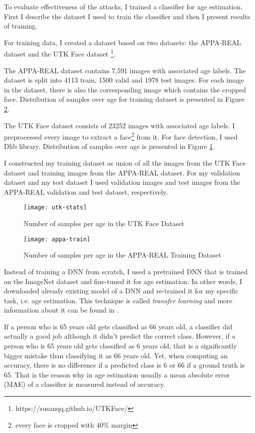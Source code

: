 To evaluate effectiveness of the attacks, I trained a classifier for age estimation. 
First I describe the dataset I used to train the classifier and then I present results of training. 

For training data, I created a dataset based on two datasets: the APPA-REAL dataset \cite{agustsson2017appareal}  and the UTK Face dataset \footnote{https://susanqq.github.io/UTKFace/}.

The APPA-REAL dataset contains 7,591 images with associated age labels. The dataset is split into 4113 train, 1500 valid and 1978 test images. For each image in the dataset, there is also the corresponding image which contains the cropped face. Distribution of samples over age for training dataset is presented in Figure \ref{fig:appa-train-stats}.

The UTK Face dataset consists of 23252 images with associated age labels. I preprocessed every image to extract a face\footnote{every face is cropped with 40\% margin} from it. For face detection, I used Dlib \cite{dlib09} library. Distribution of samples over age is presented in Figure \ref{fig:utk-stats}.

I constructed my training dataset as union of all the images from the UTK Face dataset and training images from the APPA-REAL dataset. For my validation dataset and my test dataset I used validation images and test images from the APPA-REAL validation and test dataset, respectively. 

\begin{figure}[h]
\texttt{[image: utk-stats]}
\caption{Number of samples per age in the UTK Face Dataset}
\label{fig:utk-stats}
\end{figure}

\begin{figure}[h]
\texttt{[image: appa-train]}
\caption{Number of samples per age in the APPA-REAL Training Dataset}
\label{fig:appa-train-stats}
\end{figure}

Instead of training a DNN from scratch, I used a pretrained DNN that is trained on the ImageNet dataset and fine-tuned it for age estimation. In other words, I downloaded already existing model of a DNN and re-trained it for my specific task, i.e. age estimation. This technique is called \textit{transfer learning} and more information about it can be found in \cite{yosinski2014transferable}.

If a person who is 65 years old gets classified as 66 years old, a classifier did actually a good job although it didn't predict the correct class. However, if a person who is 65 years old gets classified as 6 years old, that is a significantly bigger mistake than classifying it as 66 years old. Yet, when computing an accuracy, there is no difference if a predicted class is 6 or 66 if a ground truth is 65. That is the reason why in age estimation usually a mean absolute error (MAE) of a classifier is measured instead of accuracy.

